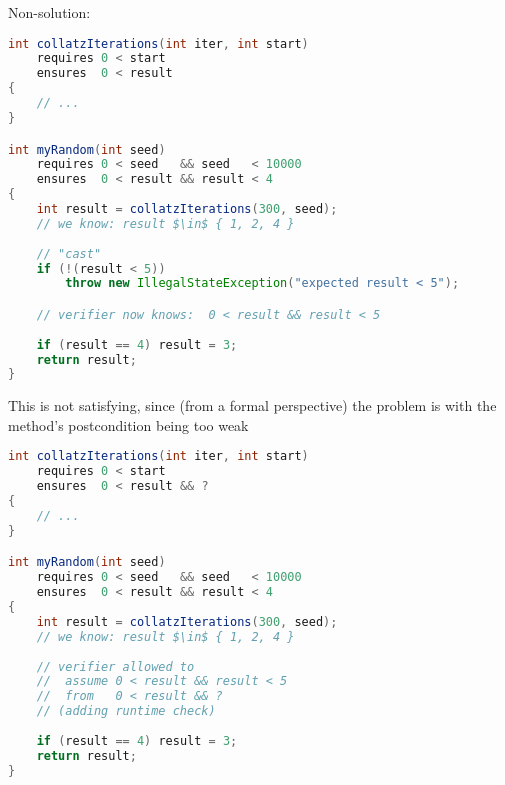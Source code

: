 Non-solution:
\begin{lstlisting}[language=Java]
int collatzIterations(int iter, int start)
    requires 0 < start
    ensures  0 < result
{
    // ...
}

int myRandom(int seed)
    requires 0 < seed   && seed   < 10000
    ensures  0 < result && result < 4
{
    int result = collatzIterations(300, seed);
    // we know: result $\in$ { 1, 2, 4 }
    
    // "cast"
    if (!(result < 5))
        throw new IllegalStateException("expected result < 5");

    // verifier now knows:  0 < result && result < 5 
    
    if (result == 4) result = 3;
    return result;
}
\end{lstlisting}
This is not satisfying, since (from a formal perspective) the problem is with the method's postcondition being too weak


\begin{lstlisting}[language=Java]
int collatzIterations(int iter, int start)
    requires 0 < start
    ensures  0 < result && ?
{
    // ...
}

int myRandom(int seed)
    requires 0 < seed   && seed   < 10000
    ensures  0 < result && result < 4
{
    int result = collatzIterations(300, seed);
    // we know: result $\in$ { 1, 2, 4 }
    
    // verifier allowed to
    //  assume 0 < result && result < 5
    //  from   0 < result && ?
    // (adding runtime check)
    
    if (result == 4) result = 3;
    return result;
}
\end{lstlisting}



